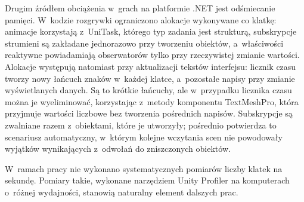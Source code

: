 Drugim źródłem obciążenia w~grach na platformie .NET jest odśmiecanie pamięci. W~kodzie
rozgrywki ograniczono alokacje wykonywane co klatkę: animacje korzystają z~UniTask, którego
typ zadania jest strukturą, subskrypcje strumieni są zakładane jednorazowo przy tworzeniu
obiektów, a~właściwości reaktywne powiadamiają obserwatorów tylko przy rzeczywistej zmianie
wartości. Alokacje występują natomiast przy aktualizacji tekstów interfejsu: licznik czasu
tworzy nowy łańcuch znaków w~każdej klatce, a~pozostałe napisy przy zmianie wyświetlanych
danych. Są to krótkie łańcuchy, ale w~przypadku licznika czasu można je wyeliminować,
korzystając z~metody  komponentu TextMeshPro, która przyjmuje wartości liczbowe
bez tworzenia pośrednich napisów. Subskrypcje są zwalniane razem z~obiektami, które je
utworzyły; pośrednio potwierdza to scenariusz automatyczny, w~którym kolejne wczytania scen
nie powodowały wyjątków wynikających z~odwołań do zniszczonych obiektów.

W~ramach pracy nie wykonano systematycznych pomiarów liczby klatek na sekundę. Pomiary
takie, wykonane narzędziem Unity Profiler na komputerach o~różnej wydajności, stanowią
naturalny element dalszych prac.
